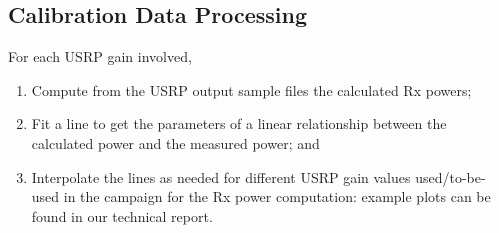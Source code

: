 \documentclass[12pt, draftcls, onecolumn]{IEEEtran}
\begin{document}
\subsection{Calibration Data Processing}
For each USRP gain involved,
\begin{enumerate}
    \item Compute from the USRP output sample files the calculated Rx powers;
    \item Fit a line to get the parameters of a linear relationship between the calculated power and the measured power; and
    \item Interpolate the lines as needed for different USRP gain values used/to-be-used in the campaign for the Rx power computation: example plots can be found in our technical report.
\end{enumerate}
    
\end{document}
